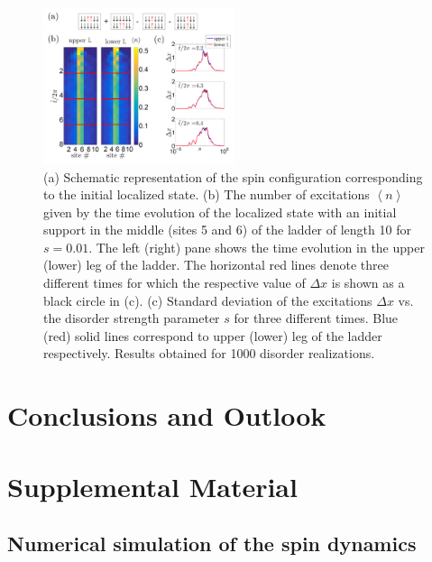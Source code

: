 \documentclass[prl,aps,twocolumn,showpacs,superscriptaddress,longbibliography]{revtex4-1}
\newcommand{\lan}{\left\langle}
\newcommand{\ran}{\right\rangle}
\newcommand{\av}[1]{\lan #1 \ran}
\begin{document}
\begin{figure}

	      \includegraphics[width=0.5\textwidth]{graphics/time_evolution_CLS_PaperSupport_v2.pdf}
		\caption{(a) Schematic representation of the spin configuration corresponding to the initial localized state. (b) The number of excitations $\av{n}$ given by the time evolution of the localized state with an initial support in the middle (sites 5 and 6) of the ladder of length 10 for $s=0.01$. The left (right) pane shows the time evolution in the upper (lower) leg of the ladder. The horizontal red lines denote three different times for which the respective value of $\Delta x$ is shown as a black circle in (c). (c) Standard deviation of the excitations $\Delta x$ vs. the disorder strength parameter $s$ for three different times. Blue (red) solid lines correspond to upper (lower) leg of the ladder respectively. Results obtained for 1000 disorder realizations.}

 \label{Fig:time evolution}
   
\end{figure}  

\section{Conclusions and Outlook}



%
\section{Supplemental Material}


\subsection{Numerical simulation of the spin dynamics}
\end{document}
